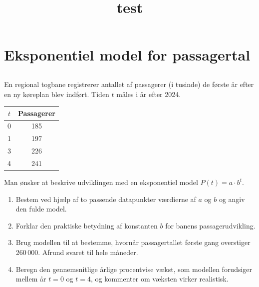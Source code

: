 \documentclass[10pt,a4paper,table]{article}
\title{\vestb test}
\author{}
\date{}
\begin{document}
\thispagestyle{plain}

\section{Eksponentiel model for passagertal}
\subsection{}
En regional togbane registrerer antallet af passagerer (i tusinde) de første år efter en ny køreplan blev indført. Tiden $t$ måles i år efter 2024.

\begin{center}
  \begin{tabular}{c|c}
    $t$ & Passagerer \\ \hline
    0 & 185 \\
    1 & 197 \\
    3 & 226 \\
    4 & 241 \\
  \end{tabular}
\end{center}

Man ønsker at beskrive udviklingen med en eksponentiel model $P(t)=a\cdot b^{t}$.

\begin{enumerate}
  \item Bestem ved hjælp af to passende datapunkter værdierne af $a$ og $b$ og angiv den fulde model.
  \item Forklar den praktiske betydning af konstanten $b$ for banens passagerudvikling.
  \item Brug modellen til at bestemme, hvornår passagertallet første gang overstiger 260\,000. Afrund svaret til hele måneder.
  \item Beregn den gennemsnitlige årlige procentvise vækst, som modellen forudsiger mellem år $t=0$ og $t=4$, og kommenter om væksten virker realistisk.
\end{enumerate}
\end{document}
